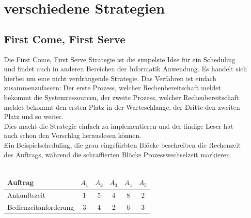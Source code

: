 \section{verschiedene Strategien}
\subsection{First Come, First Serve}
Die First Come, First Serve Strategie ist die simpelste Idee für ein Scheduling und findet auch in anderen 
Bereichen der Informatik Anwendung. Es handelt sich hierbei um eine nicht verdrängende Strategie.
Das Verfahren ist einfach zusammenzufassen: Der erste Prozess, welcher Rechenbereitschaft meldet bekommt 
die Systemressourcen, der zweite Prozess, welcher Rechenbereitschaft meldet bekommt den ersten Platz in der 
Warteschlange, der Dritte den zweiten Platz und so weiter. \\
Dies macht die Strategie einfach zu implementieren und der findige Leser hat auch schon den Vorschlag 
herauslesen können. \\
Ein Beispielscheduling, die grau eingefärbten Blöcke beschreiben die Rechenzeit des Auftrags, während die 
schraffierten Blöcke Prozesswechselzeit markieren. \\ \\
\begin{center}
\begin{tabular}{l|c|c|c|c|c}
	Auftrag               & \(A_1\)  & \(A_2\)  & \(A_3\) & \(A_4\) & \(A_5\) \\ \hline \hline
	Ankunftszeit		  & 1        &  5		& 4       & 8       &  2      \\ \hline
	Bedienzeitanforderung & 3        &  4       & 2       & 6       &  3      \\
\end{tabular}
\end{center}
\begin{center}
\begin{blockgraph}{25}{1}{0.4}
   
\end{blockgraph}
\end{center}


